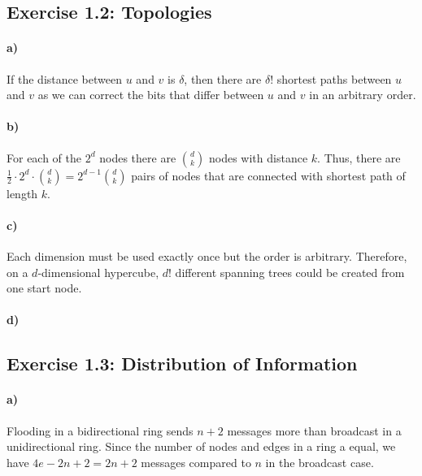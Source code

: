 \documentclass[12pt,a4paper]{article}
\begin{document}
\subsection*{Exercise 1.2: Topologies}
\paragraph{a)} %
If the distance between $u$ and $v$ is $\delta$, then there are $\delta!$ shortest paths between $u$ and $v$ as we can correct the bits that differ between $u$ and $v$ in an arbitrary order.
\paragraph{b)} %
For each of the $2^d$ nodes there are $\binom{d}{k}$ nodes with distance $k$.
Thus, there are $\frac{1}{2}\cdot2^d\cdot\binom{d}{k}=2^{d-1}\binom{d}{k}$ pairs of nodes that are connected with shortest path of length $k$.
\paragraph{c)} %
Each dimension must be used exactly once but the order is arbitrary. Therefore, on a $d$-dimensional hypercube, $d!$ different spanning trees could be created from one start node.
\paragraph{d)} %

\subsection*{Exercise 1.3: Distribution of Information}
\paragraph{a)} Flooding in a bidirectional ring sends $n+2$ messages more than broadcast in a unidirectional ring. Since the number of nodes and edges in a ring a equal, we have $4e-2n+2=2n+2$ messages compared to $n$ in the broadcast case.
\end{document}
